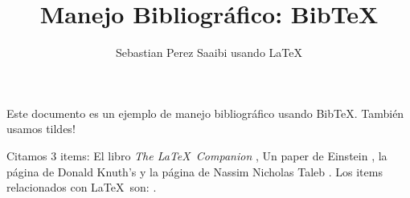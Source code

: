\documentclass[a4paper,10pt]{article}
\title{Manejo Bibliográfico: BibTeX}
\author{Sebastian Perez Saaibi usando \LaTeX}
\begin{document}
\maketitle

Este documento es un ejemplo de manejo bibliográfico usando BibTeX. También usamos tildes!

Citamos 3 items: El libro \textit{The \LaTeX\ Companion} \cite{latexcompanion}, Un paper de Einstein \cite{einstein}, la página de Donald Knuth's \cite{knuthwebsite} y la página de Nassim Nicholas Taleb \cite{nntalebwebsite}. Los items relacionados con \LaTeX\ son: \cite{latexcompanion,knuthwebsite}.

\medskip


\end{document}
